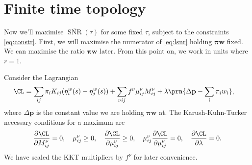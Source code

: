 \documentclass[12pt]{article}
\newcommand{\prm}{p}
\newcommand{\pr}{\mathbf{\prm}}
\newcommand{\eqm}{\pi}
\newcommand{\eq}{\boldsymbol{\eqm}}
\newcommand{\etwm}{\eta^w}
\newcommand{\wm}{w}
\newcommand{\w}{\mathbf{\wm}}
\newcommand{\MMdm}{M}
\newcommand{\encm}{K}
\DeclareMathOperator{\snr}{SNR}
\newcommand{\snrb}{\overline{\snr}}
\renewcommand{\pdiff}[2]{\frac{\partial #1}{\partial #2}}
\begin{document}
\section{Finite time topology}\label{sec:finite}

Now we'll maximise \(\snrb(\tau)\) for some fixed \(\tau\), subject to the constraints \eqref{eq:constr}.
First, we will maximise the numerator of \eqref{eq:lsnr} holding \(\eq\w\) fixed.
We can maximise the ratio \wrt \(\eq\w\) later.
From this point on, we work in units where \(r = 1\).

Consider the Lagrangian
%
\begin{equation}\label{eq:finitelagrangian}
\begin{aligned}
  \CL =&\, \sum_{ij} \eqm_i \encm_{ij} (\etwm_i(s) - \etwm_j(s))
        +\sum_{\nu i j} { f^\nu \mu^\nu_{ij} \MMdm^\nu_{ij} }
        + \lambda \prn{ \Delta\pr - \sum_i \eqm_i \wm_i },
\end{aligned}
\end{equation}
%
where \(\Delta\pr\) is the constant value we are holding \(\eq\w\) at.
The Karush-Kuhn-Tucker necessary conditions for a maximum are
%
\begin{equation}\label{eq:KTfinite}
  \pdiff{\CL}{\MMdm^\nu_{ij}} = 0, \quad
  \mu^\nu_{ij} \geq 0, \quad
  \pdiff{\CL}{\mu^\nu_{ij}} \geq 0, \quad
  \mu^\nu_{ij}\pdiff{\CL}{\mu^\nu_{ij}} = 0, \quad
  \pdiff{\CL}{\lambda} = 0.
\end{equation}
%
We have scaled the KKT multipliers by \(f^\nu\) for later convenience.
\end{document}
